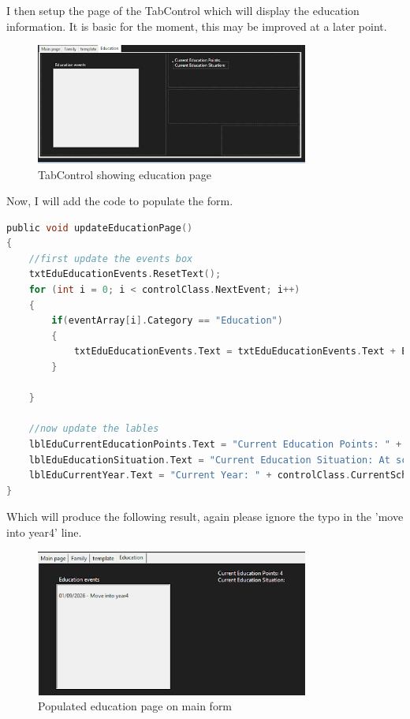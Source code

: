\noindent I then setup the page of the TabControl which will display the education information. It is basic for the moment, this may be improved at a later point.
\begin{figure}[H]
    \centering
    \includegraphics[width=0.8\textwidth]{images/implementation/educationTest2.png}
    \caption{TabControl showing education page}
    \label{fig:implementation-educationTest2}
\end{figure}
\noindent Now, I will add the code to populate the form.
\begin{lstlisting}[language=c, style=csharp, caption=Code to populate the education page on the main game form]
public void updateEducationPage()
{
    //first update the events box
    txtEduEducationEvents.ResetText();
    for (int i = 0; i < controlClass.NextEvent; i++)
    {
        if(eventArray[i].Category == "Education")
        {
            txtEduEducationEvents.Text = txtEduEducationEvents.Text + Environment.NewLine + eventArray[i].DateHappened.ToShortDateString() + " - " + eventArray[i].Description;
        }
        
    }

    //now update the lables
    lblEduCurrentEducationPoints.Text = "Current Education Points: " + mainCharacterScores.EducationScore.ToString();
    lblEduEducationSituation.Text = "Current Education Situation: At school - " + controlClass.NameOfCurrentSchool;
    lblEduCurrentYear.Text = "Current Year: " + controlClass.CurrentSchoolYear.ToString();
}
\end{lstlisting}
Which will produce the following result, again please ignore the typo in the 'move into year4' line.
\begin{figure}[H]
    \centering
    \includegraphics[width=0.8\textwidth]{images/implementation/educationTest3.png}
    \caption{Populated education page on main form}
    \label{fig:implementation-educationTest3}
\end{figure}

